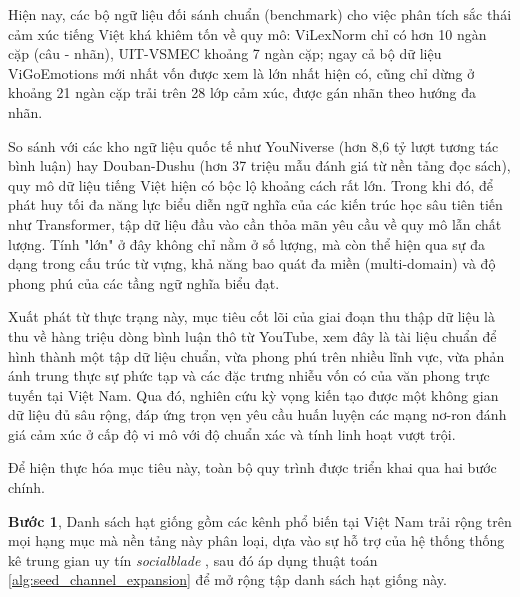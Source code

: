 Hiện nay, các bộ ngữ liệu đối sánh chuẩn (benchmark) cho việc phân tích sắc thái cảm xúc tiếng Việt khá khiêm tốn về quy mô: ViLexNorm chỉ có hơn 10 ngàn cặp (câu - nhãn), UIT-VSMEC khoảng 7 ngàn cặp; ngay cả bộ dữ liệu ViGoEmotions mới nhất vốn được xem là lớn nhất hiện có, cũng chỉ dừng ở khoảng 21 ngàn cặp trải trên 28 lớp cảm xúc, được gán nhãn theo hướng đa nhãn.

So sánh với các kho ngữ liệu quốc tế như YouNiverse \parencite{ribeiro2021youniverse} (hơn 8,6 tỷ lượt tương tác bình luận) hay Douban-Dushu \parencite{zhao2018lsicc} (hơn 37 triệu mẫu đánh giá từ nền tảng đọc sách), quy mô dữ liệu tiếng Việt hiện có bộc lộ khoảng cách rất lớn. Trong khi đó, để phát huy tối đa năng lực biểu diễn ngữ nghĩa của các kiến trúc học sâu tiên tiến như Transformer, tập dữ liệu đầu vào cần thỏa mãn yêu cầu về quy mô lẫn chất lượng. Tính "lớn" ở đây không chỉ nằm ở số lượng, mà còn thể hiện qua sự đa dạng trong cấu trúc từ vựng, khả năng bao quát đa miền (multi-domain) và độ phong phú của các tầng ngữ nghĩa biểu đạt.

Xuất phát từ thực trạng này, mục tiêu cốt lõi của giai đoạn thu thập dữ liệu là thu về hàng triệu dòng bình luận thô từ YouTube, xem đây là tài liệu chuẩn để hình thành một tập dữ liệu chuẩn, vừa phong phú trên nhiều lĩnh vực, vừa phản ánh trung thực sự phức tạp và các đặc trưng nhiễu vốn có của văn phong trực tuyến tại Việt Nam. Qua đó, nghiên cứu kỳ vọng kiến tạo được một không gian dữ liệu đủ sâu rộng, đáp ứng trọn vẹn yêu cầu huấn luyện các mạng nơ-ron đánh giá cảm xúc ở cấp độ vi mô với độ chuẩn xác và tính linh hoạt vượt trội.

Để hiện thực hóa mục tiêu này, toàn bộ quy trình được triển khai qua hai bước chính.

\textbf{Bước 1}, Danh sách hạt giống gồm các kênh phổ biến tại Việt Nam trải rộng trên mọi hạng mục mà nền tảng này phân loại, dựa vào sự hỗ trợ của hệ thống thống kê trung gian uy tín \textit{socialblade} \parencite{socialblade}, sau đó áp dụng thuật toán \ref{alg:seed_channel_expansion} để mở rộng tập danh sách hạt giống này.

